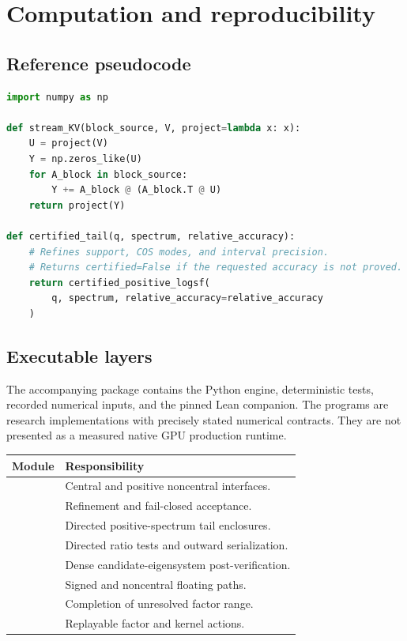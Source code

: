 \chapter{Computation and reproducibility}\label{app:reproduction}

\section{Reference pseudocode}\label{sec:final-A}

\begin{lstlisting}[language=Python]
import numpy as np

def stream_KV(block_source, V, project=lambda x: x):
    U = project(V)
    Y = np.zeros_like(U)
    for A_block in block_source:
        Y += A_block @ (A_block.T @ U)
    return project(Y)

def certified_tail(q, spectrum, relative_accuracy):
    # Refines support, COS modes, and interval precision.
    # Returns certified=False if the requested accuracy is not proved.
    return certified_positive_logsf(
        q, spectrum, relative_accuracy=relative_accuracy
    )
\end{lstlisting}


\section{Executable layers}\label{sec:final-B}
The accompanying package contains the Python engine, deterministic tests,
recorded numerical inputs, and the pinned Lean companion. The programs are
research implementations with precisely stated numerical contracts. They are
not presented as a measured native GPU production runtime.

\begin{longtable}{@{}P{.40\linewidth}P{.55\linewidth}@{}}
\toprule
Module & Responsibility\\
\midrule
\endhead
{} & Central and positive noncentral interfaces.\\
 & Refinement and fail-closed acceptance.\\
 & Directed positive-spectrum tail enclosures.\\
 & Directed ratio tests and outward serialization.\\
 & Dense candidate-eigensystem post-verification.\\
 & Signed and noncentral floating paths.\\
 & Completion of unresolved factor range.\\
 & Replayable factor and kernel actions.\\
\bottomrule
\end{longtable}

